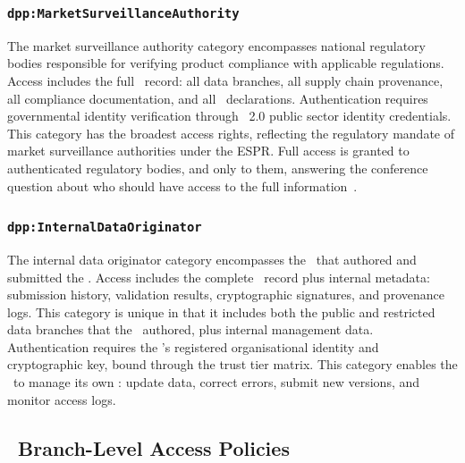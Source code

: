 \subsubsection{\texttt{dpp:MarketSurveillanceAuthority}}

The market surveillance authority category encompasses national regulatory
bodies responsible for verifying product compliance with applicable regulations.
Access includes the full \DPP\ record: all data branches, all supply chain
provenance, all compliance documentation, and all \REO\ declarations.
Authentication requires governmental identity verification through \eIDAS~2.0
public sector identity credentials. This category has the broadest access
rights, reflecting the regulatory mandate of market surveillance authorities
under the ESPR. Full access is granted to authenticated regulatory bodies, and
only to them, answering the conference question about who should have access to
the full information~\cite{dpp4eu2026_day1}.

\subsubsection{\texttt{dpp:InternalDataOriginator}}

The internal data originator category encompasses the \REO\ that authored and
submitted the \DPP. Access includes the complete \DPP\ record plus internal
metadata: submission history, validation results, cryptographic signatures, and
provenance logs. This category is unique in that it includes both the public and
restricted data branches that the \REO\ authored, plus internal management data.
Authentication requires the \REO's registered organisational identity and
cryptographic key, bound through the trust tier matrix. This category enables
the \REO\ to manage its own \DPPs: update data, correct errors, submit new
versions, and monitor access logs.

\subsection{\ODRL\ Branch-Level Access Policies}

